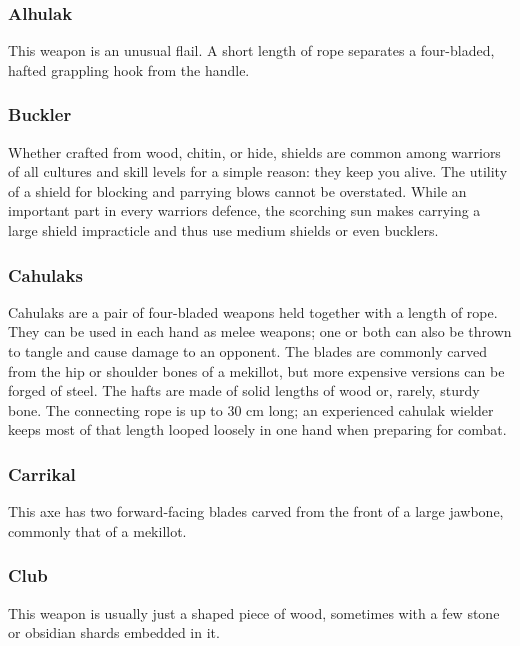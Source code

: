 \begin{multicols}{2}

\subsubsection{Alhulak}
\label{itmmlee:alhulak}
This weapon is an unusual flail. A short length of rope separates
a four-bladed, hafted grappling hook from the handle.

\subsubsection{Buckler}
\label{itmmlee:buckler}
Whether crafted from wood, chitin, or hide, shields are
common among warriors of all cultures and skill levels for
a simple reason: they keep you alive. The utility of a shield
for blocking and parrying blows cannot be overstated. While
an important part in every warriors defence, the scorching sun
makes carrying a large shield impracticle and thus use medium
shields or even bucklers.

\subsubsection{Cahulaks}
\label{itmmlee:cahulaks}
Cahulaks are a pair of four-bladed weapons
held together with a length of rope.
They can be used in each hand as melee
weapons; one or both can also be thrown to
tangle and cause damage to an opponent.
The blades are commonly carved from
the hip or shoulder bones of a mekillot,
but more expensive versions can be forged
of steel. The hafts are made of solid
lengths of wood or, rarely, sturdy bone.
The connecting rope is up to 30 cm long; an
experienced cahulak wielder keeps most
of that length looped loosely in one hand
when preparing for combat.

\subsubsection{Carrikal}
\label{itmmlee:carrikal}
This axe has two forward-facing blades carved from the front
of a large jawbone, commonly that of a mekillot.

\subsubsection{Club}
\label{itmmlee:club}
This weapon is usually just a shaped piece of wood, sometimes
with a few stone or obsidian shards embedded in it.


\end{multicols}
